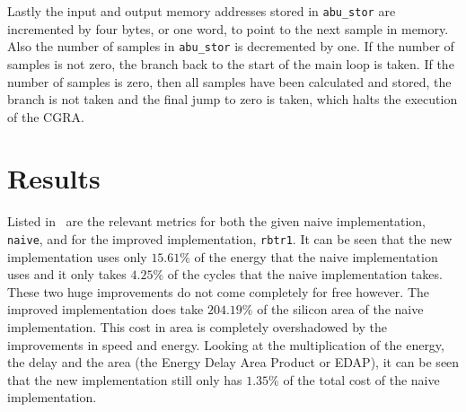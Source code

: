 \documentclass[10pt,twocolumn]{article}
\begin{document}
Lastly the input and output memory addresses stored in
\texttt{abu\_stor} are incremented by four bytes, or one word, to
point to the next sample in memory. Also the number of samples in
\texttt{abu\_stor} is decremented by one. If the number of samples is
not zero, the branch back to the start of the main loop is taken. If
the number of samples is zero, then all samples have been calculated
and stored, the branch is not taken and the final jump to zero is
taken, which halts the execution of the CGRA.


\section{Results}
\label{sec:results}
\begin{table}
  \centering
  \caption{Different metrics for the naive implementation and the
    improved implementation.}
  \label{tbl:results}
\end{table}

Listed in~ are the relevant metrics for both the
given naive implementation, \texttt{naive}, and for the improved
implementation, \texttt{rbtr1}. It can be seen that the new
implementation uses only $15.61\%$ of the energy that the naive
implementation uses and it only takes $4.25\%$ of the cycles that the
naive implementation takes. These two huge improvements do not come
completely for free however. The improved implementation does take
$204.19\%$ of the silicon area of the naive implementation. This cost
in area is completely overshadowed by the improvements in speed and
energy. Looking at the multiplication of the energy, the delay and the
area (the Energy Delay Area Product or EDAP), it can be seen that the
new implementation still only has $1.35\%$ of the total cost of the
naive implementation.
\end{document}
